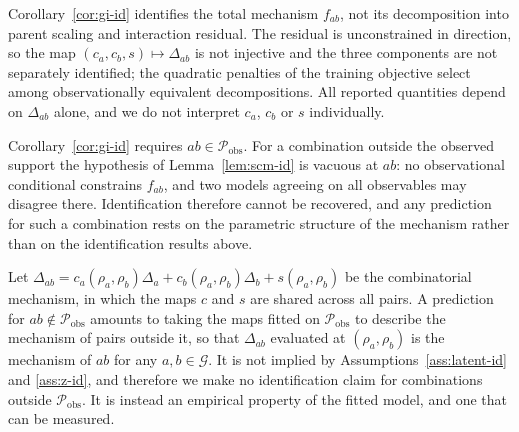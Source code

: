 \begin{remark}\label{rem:decomp}
    Corollary~\ref{cor:gi-id} identifies the total mechanism $f_{ab}$, not its decomposition into
    parent scaling and interaction residual. The residual is unconstrained in direction, so the map
    $(c_a, c_b, s) \mapsto \Delta_{ab}$ is not injective and the three components are not separately
    identified; the quadratic penalties of the training objective select among observationally
    equivalent decompositions. All reported quantities depend on $\Delta_{ab}$ alone, and we do not
    interpret $c_a$, $c_b$ or $s$ individually.
\end{remark}

Corollary~\ref{cor:gi-id} requires $ab \in \mathcal{P}_{\mathrm{obs}}$. For a combination outside the
observed support the hypothesis of Lemma~\ref{lem:scm-id} is vacuous at $ab$: no observational
conditional constrains $f_{ab}$, and two models agreeing on all observables may disagree there.
Identification therefore cannot be recovered, and any prediction for such a combination rests on the
parametric structure of the mechanism rather than on the identification results above.

\begin{remark}\label{rem:transfer}
    Let $\Delta_{ab} = c_a(\rho_a,\rho_b)\Delta_a + c_b(\rho_a,\rho_b)\Delta_b + s(\rho_a,\rho_b)$ be
    the combinatorial mechanism, in which the maps $c$ and $s$ are shared across all pairs. A
    prediction for $ab \notin \mathcal{P}_{\mathrm{obs}}$ amounts to taking the maps fitted on
    $\mathcal{P}_{\mathrm{obs}}$ to describe the mechanism of pairs outside it, so that $\Delta_{ab}$
    evaluated at $(\rho_a, \rho_b)$ is the mechanism of $ab$ for any $a, b \in \mathcal{G}$.  It is not implied by
    Assumptions~\ref{ass:latent-id} and \ref{ass:z-id},  and therefore we make no identification claim for combinations
    outside $\mathcal{P}_{\mathrm{obs}}$. It is instead an empirical property of the fitted model, and
    one that can be measured. 
\end{remark}